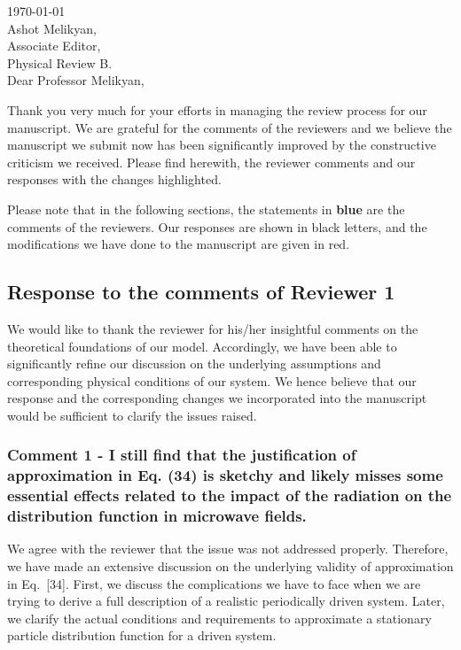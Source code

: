 \documentclass{article}
\begin{document}

\today\\

Ashot Melikyan,\\
Associate Editor,\\
Physical Review B.\\

Dear Professor Melikyan,

Thank you very much for your efforts in managing the review process for our manuscript. We are grateful for the comments of the reviewers and we believe the manuscript we submit now has been significantly improved by the constructive criticism we received. Please find herewith, the reviewer comments and our responses with the changes highlighted.

Please note that in the following sections, the statements in {\color{RoyalBlue} \textbf{blue}} are the comments of the reviewers. Our responses are shown in black letters, and the modifications we have done to the manuscript are given in {\color{Red} red}.

\subsection*{Response to the comments of Reviewer 1}

We would like to thank the reviewer for his/her insightful comments on the theoretical foundations of our model. Accordingly, we have been able to significantly refine our discussion on the underlying assumptions and corresponding physical conditions of our system. We hence believe that our response and the corresponding changes we incorporated into the manuscript would be sufficient to clarify the issues raised.

\subsubsection*{Comment 1 -
\color{RoyalBlue} I still find that the justification of approximation in Eq. (34) is sketchy and likely misses some essential effects related to the impact of the radiation on the distribution function in microwave fields.}

We agree with the reviewer that the issue was not addressed properly. Therefore, we have made an extensive discussion on the underlying validity of approximation in Eq.~[34]. First, we discuss the complications we have to face when we are trying to derive a full description of a realistic periodically driven system. Later, we clarify the actual conditions and requirements to approximate a stationary particle distribution function for a driven system.
\end{document}
